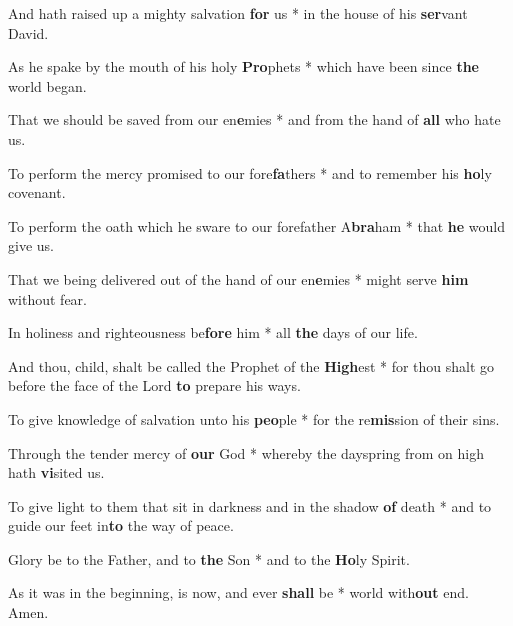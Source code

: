 \begin{multicols}{2}
	And hath raised up a mighty salvation \textbf{for} us * in the house of his \textbf{ser}vant David.
	
	As he spake by the mouth of his holy \textbf{Pro}phets *  which have been since \textbf{the} world began.
	
	That we should be saved from our en\textbf{e}mies *  and from the hand of \textbf{all} who hate us.
	
	To perform the mercy promised to our fore\textbf{fa}thers * and to remember his \textbf{ho}ly covenant.
	
	To perform the oath which he sware to our forefather A\textbf{bra}ham *  that \textbf{he} would give us.
	
	That we being delivered out of the hand of our en\textbf{e}mies *  might serve \textbf{him} without fear.
	
	In holiness and righteousness be\textbf{fore} him *  all \textbf{the} days of our life.
	
	And thou, child, shalt be called the Prophet of the \textbf{High}est * for thou shalt go before the face of the Lord \textbf{to} prepare his ways.
	
	To give knowledge of salvation unto his \textbf{peo}ple *  for the re\textbf{mis}sion of their sins.
	
	Through the tender mercy of \textbf{our} God * whereby the dayspring from on high hath \textbf{vi}sited us.
	
	To give light to them that sit in darkness and in the shadow \textbf{of} death * and to guide our feet in\textbf{to} the way of peace.
	
	Glory be to the Father, and to \textbf{the} Son *  and to the \textbf{Ho}ly Spirit.
	
	As it was in the beginning, is now, and ever \textbf{shall} be *  world with\textbf{out} end. Amen.
\end{multicols}